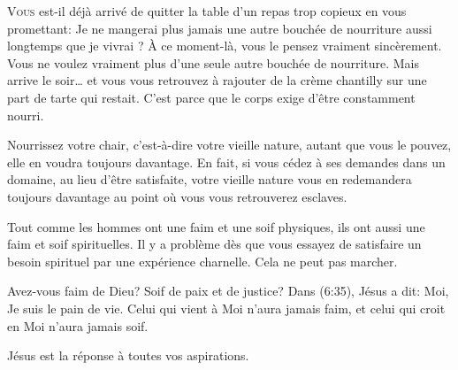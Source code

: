 



\lettrine{V}{ous} est-il déjà arrivé de quitter la table d'un repas
 trop copieux en vous promettant:
 \Og Je ne mangerai plus jamais une autre bouchée de nourriture aussi longtemps
 que je vivrai \Fg{}?
 À ce moment-là,  vous le pensez vraiment sincèrement.
 Vous ne voulez vraiment plus d'une seule autre bouchée de nourriture.
 Mais arrive le soir\dots{} et vous vous retrouvez à rajouter
 de la crème chantilly sur une part de tarte qui restait.
 C'est parce que le corps exige d'être constamment nourri.


Nourrissez votre chair, c'est-à-dire votre vieille nature,
 autant que vous le pouvez, elle en voudra toujours davantage.
 En fait,  si vous cédez à ses demandes dans un domaine,
 au lieu d'être satisfaite, votre vieille nature vous en redemandera
 toujours davantage au point où vous vous retrouverez 
 esclaves.

Tout comme les hommes ont une faim et une soif physiques,
 ils ont aussi une faim et soif spirituelles.
 Il y a problème dès que vous essayez de satisfaire un besoin spirituel
 par une expérience charnelle. Cela ne peut pas marcher.

Avez-vous  faim de Dieu? Soif de paix et de justice?
 Dans (6:35), Jésus a dit:
 \Og Moi, Je suis le pain de vie. Celui qui vient à Moi n'aura jamais faim,
 et celui qui croit en Moi n'aura jamais soif. \Fg{}

Jésus est la réponse à toutes vos aspirations. 

\dvrule


